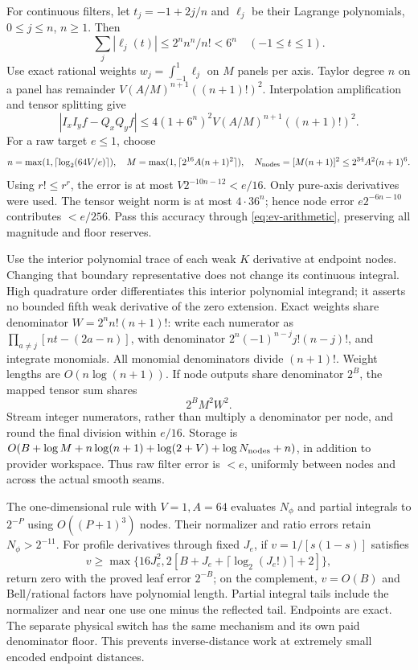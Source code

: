 For continuous filters, let $t_j=-1+2j/n$ and $\ell_j$ be their
Lagrange polynomials, $0\le j\le n$, $n\ge1$. Then
\[
 \sum_j|\ell_j(t)|\le2^nn^n/n!<6^n\quad(-1\le t\le1).
\]
Use exact rational weights $w_j=\int_{-1}^1\ell_j$ on $M$ panels
per axis. Taylor degree $n$ on a panel has remainder
$V(A/M)^{n+1}((n+1)!)^2$. Interpolation amplification and tensor
splitting give
\begin{equation}
 |I_xI_yf-Q_xQ_yf|
 \le4(1+6^n)^2V(A/M)^{n+1}((n+1)!)^2.
 \label{eq:pc-filter-remainder}
\end{equation}
For a raw target $e\le1$, choose
\begin{equation}
 n=\max(1,\lceil\log_2(64V/e)\rceil),\quad
 M=\max(1,\lceil2^{16}A(n+1)^2\rceil),\quad
 N_{\rm nodes}=[M(n+1)]^2\le2^{34}A^2(n+1)^6.
 \label{eq:pc-filter-nodes}
\end{equation}
Using $r!\le r^r$, the error is at most
$V2^{-10n-12}<e/16$. Only pure-axis derivatives were used.
The tensor weight norm is at most $4\cdot36^n$; hence node
error $e2^{-6n-10}$ contributes $<e/256$. Pass this accuracy through
\eqref{eq:ev-arithmetic}, preserving all magnitude and floor reserves.

Use the interior polynomial trace of each weak $K$ derivative at
endpoint nodes. Changing that boundary representative does not change
its continuous integral. High quadrature order differentiates this
interior polynomial integrand; it asserts no bounded fifth weak
derivative of the zero extension. Exact weights share denominator
$W=2^nn!(n+1)!$: write each numerator as
$\prod_{a\ne j}[nt-(2a-n)]$, with denominator
$2^n(-1)^{n-j}j!(n-j)!$, and integrate monomials. All monomial
denominators divide $(n+1)!$. Weight lengths are $O(n\log(n+1))$.
If node outputs share denominator $2^B$, the mapped tensor sum shares
\begin{equation}
 2^BM^2W^2.
 \label{eq:pc-sum-denominator}
\end{equation}
Stream integer numerators, rather than multiply a denominator per node,
and round the final division within $e/16$. Storage is
$O(B+\log M+n\log(n+1)+\log(2+V)+\log N_{\rm nodes}+n)$,
in addition to provider workspace. Thus raw filter error is $<e$,
uniformly between nodes and across the actual smooth seams.

The one-dimensional rule with $V=1,A=64$ evaluates $N_\phi$ and
partial integrals to $2^{-P}$ using $O((P+1)^3)$ nodes. Their
normalizer and ratio errors retain $N_\phi>2^{-11}$. For profile
derivatives through fixed $J_e$, if $v=1/[s(1-s)]$ satisfies
\[
 v\ge\max\{16J_e^2,2[B+J_e+\lceil\log_2(J_e!)\rceil+2]\},
\]
return zero with the proved leaf error $2^{-B}$; on the complement,
$v=O(B)$ and Bell/rational factors have polynomial length. Partial
integral tails include the normalizer and near one use one minus the
reflected tail. Endpoints are exact. The separate physical switch has
the same mechanism and its own paid denominator floor. This prevents
inverse-distance work at extremely small encoded endpoint distances.

